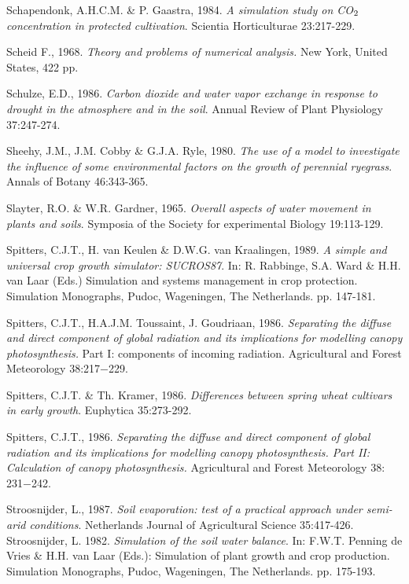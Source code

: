 Schapendonk, A.H.C.M. \& P. Gaastra, 1984. {\it A simulation study on CO$_{{\rm 2}}$ concentration in protected
cultivation\/}. Scientia Horticulturae 23:217-229.

Scheid F., 1968. {\it Theory and problems of numerical analysis.\/} New York, United States, 422 pp.

Schulze, E.D., 1986. {\it Carbon dioxide and water vapor exchange in response to drought in the
atmosphere and in the soil\/}. Annual Review of Plant Physiology 37:247-274.

Sheehy, J.M., J.M. Cobby \& G.J.A. Ryle, 1980. {\it The use of a model to investigate the influence of
some environmental factors on the growth of perennial ryegrass\/}. Annals of Botany 46:343-365.

Slayter, R.O. \& W.R. Gardner, 1965. {\it Overall aspects of water movement in plants and soils\/}.
Symposia of the Society for experimental Biology 19:113-129.

Spitters, C.J.T., H. van Keulen \& D.W.G. van Kraalingen, 1989. {\it A simple and universal crop
growth simulator: SUCROS87\/}. In: R. Rabbinge, S.A. Ward \& H.H. van Laar (Eds.) Simulation and
systems management in crop protection. Simulation Monographs, Pudoc, Wageningen, The
Netherlands. pp. 147-181.

Spitters, C.J.T., H.A.J.M. Toussaint, J. Goudriaan, 1986. {\it Separating the diffuse and direct
component of global radiation and its implications for modelling canopy photosynthesis.\/} Part I:
components of incoming radiation. Agricultural and Forest Meteorology 38:217$-$229. 

Spitters, C.J.T. \& Th. Kramer, 1986. {\it Differences between spring wheat cultivars in early growth\/}.
Euphytica 35:273-292.

Spitters, C.J.T., 1986. {\it Separating the diffuse and direct component of global radiation and its
implications for modelling canopy photosynthesis. Part II: Calculation of canopy photosynthesis.\/}
Agricultural and Forest Meteorology 38: 231$-$242. 

Stroosnijder, L., 1987. {\it Soil evaporation: test of a practical approach under semi-arid conditions\/}.
Netherlands Journal of Agricultural Science 35:417-426.\\
 Stroosnijder, L. 1982. {\it Simulation of the soil water balance\/}. In: F.W.T. Penning de Vries \& H.H.
van Laar (Eds.): Simulation of plant growth and crop production. Simulation Monographs, Pudoc,
Wageningen, The Netherlands. pp. 175-193.

